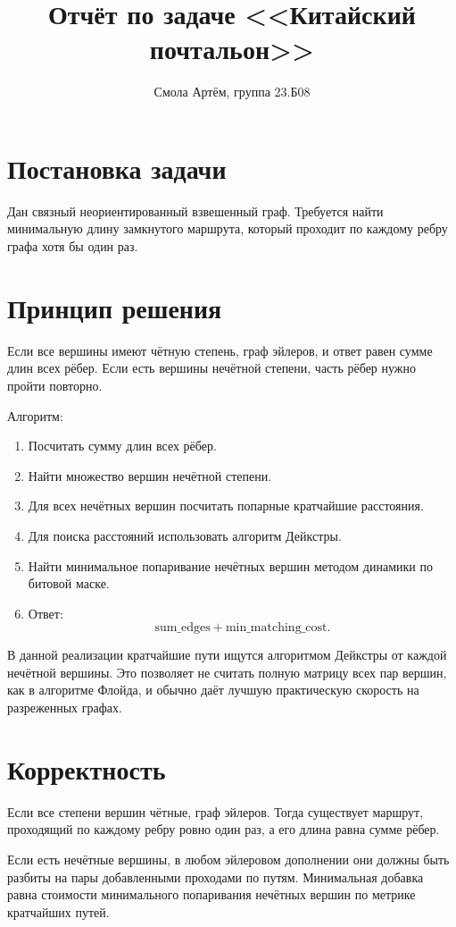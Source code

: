 \documentclass[12pt,a4paper]{article}
\title{Отчёт по задаче <<Китайский почтальон>>}
\author{Смола Артём, группа 23.Б08}
\date{}
\begin{document}
\maketitle

\section{Постановка задачи}
Дан связный неориентированный взвешенный граф.
Требуется найти минимальную длину замкнутого маршрута, который проходит по каждому ребру графа хотя бы один раз.

\section{Принцип решения}
Если все вершины имеют чётную степень, граф эйлеров, и ответ равен сумме длин всех рёбер.
Если есть вершины нечётной степени, часть рёбер нужно пройти повторно.

Алгоритм:
\begin{enumerate}
    \item Посчитать сумму длин всех рёбер.
    \item Найти множество вершин нечётной степени.
    \item Для всех нечётных вершин посчитать попарные кратчайшие расстояния.
    \item Для поиска расстояний использовать алгоритм Дейкстры.
    \item Найти минимальное попаривание нечётных вершин методом динамики по битовой маске.
    \item Ответ:
    \[
    \text{sum\_edges} + \text{min\_matching\_cost}.
    \]
\end{enumerate}
В данной реализации кратчайшие пути ищутся алгоритмом Дейкстры от каждой нечётной вершины.
Это позволяет не считать полную матрицу всех пар вершин, как в алгоритме Флойда,
и обычно даёт лучшую практическую скорость на разреженных графах.

\section{Корректность}
Если все степени вершин чётные, граф эйлеров.
Тогда существует маршрут, проходящий по каждому ребру ровно один раз, а его длина равна сумме рёбер.

Если есть нечётные вершины, в любом эйлеровом дополнении они должны быть разбиты на пары
добавленными проходами по путям.
Минимальная добавка равна стоимости минимального попаривания нечётных вершин по метрике кратчайших путей.
\end{document}
